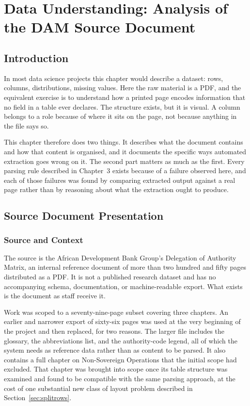 \chapter{Data Understanding: Analysis of the DAM Source Document}

\section*{Introduction}

In most data science projects this chapter would describe a dataset: rows, columns, distributions, missing values. Here the raw material is a PDF, and the equivalent exercise is to understand how a printed page encodes information that no field in a table ever declares. The structure exists, but it is visual. A column belongs to a role because of where it sits on the page, not because anything in the file says so.

This chapter therefore does two things. It describes what the document contains and how that content is organised, and it documents the specific ways automated extraction goes wrong on it. The second part matters as much as the first. Every parsing rule described in Chapter~3 exists because of a failure observed here, and each of those failures was found by comparing extracted output against a real page rather than by reasoning about what the extraction ought to produce.

\section{Source Document Presentation}

\subsection{Source and Context}

The source is the African Development Bank Group's Delegation of Authority Matrix, an internal reference document of more than two hundred and fifty pages distributed as a PDF. It is not a published research dataset and has no accompanying schema, documentation, or machine-readable export. What exists is the document as staff receive it.

Work was scoped to a seventy-nine-page subset covering three chapters. An earlier and narrower export of sixty-six pages was used at the very beginning of the project and then replaced, for two reasons. The larger file includes the glossary, the abbreviations list, and the authority-code legend, all of which the system needs as reference data rather than as content to be parsed. It also contains a full chapter on Non-Sovereign Operations that the initial scope had excluded. That chapter was brought into scope once its table structure was examined and found to be compatible with the same parsing approach, at the cost of one substantial new class of layout problem described in Section~\ref{sec:splitrows}.

